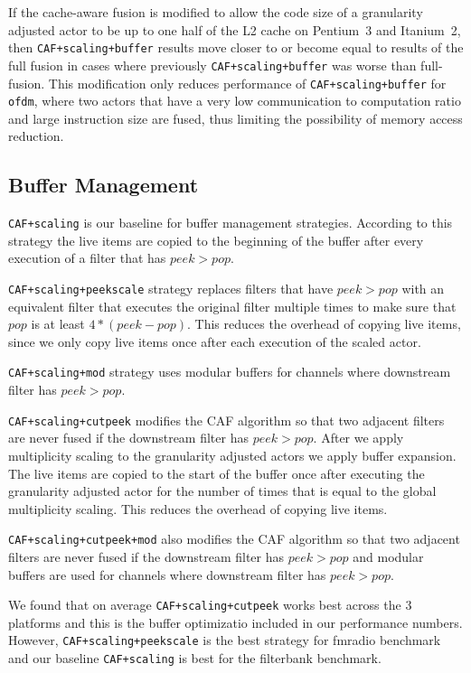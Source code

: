 If the cache-aware fusion is modified to allow the code size of a 
granularity adjusted actor to be up to one half of the L2 cache on 
Pentium~3 and Itanium~2, then \texttt{CAF+scaling+buffer} results
move closer to or become equal to results of the full fusion in cases where
previously \texttt{CAF+scaling+buffer} was worse than full-fusion.
This modification only reduces performance of \texttt{CAF+scaling+buffer}
for \texttt{ofdm}, where two actors that have a very low communication 
to computation ratio and large instruction size are fused, thus 
limiting the possibility of memory access reduction. 





\subsection{Buffer Management}

\texttt{CAF+scaling} is our baseline for buffer management strategies. 
According to this strategy the live items are copied to the beginning of 
the buffer after every execution of a filter that has 
$peek>pop$.

\texttt{CAF+scaling+peekscale} strategy replaces filters that have
$peek>pop$ with an equivalent filter that executes the original filter 
multiple times to make sure that $pop$ is at least $4*(peek-pop)$.
This reduces the overhead of copying live items, since we only copy live 
items once after each execution of the scaled actor.

\texttt{CAF+scaling+mod} strategy uses modular buffers for channels where 
downstream filter has $peek>pop$.

\texttt{CAF+scaling+cutpeek} modifies the CAF algorithm so that two 
adjacent filters are never fused if the downstream filter has 
$peek>pop$. After we apply multiplicity scaling to the 
granularity adjusted actors we apply buffer expansion. The 
live items are copied to the start of the buffer once after executing 
the granularity adjusted actor for the number of times that is equal 
to the global multiplicity scaling. This reduces the overhead of 
copying live items.

\texttt{CAF+scaling+cutpeek+mod} also modifies the CAF algorithm so 
that two adjacent filters are never fused if the downstream filter has 
$peek>pop$ and modular buffers are used for channels 
where downstream filter has $peek>pop$.

We found that on average \texttt{CAF+scaling+cutpeek} works best across 
the 3 platforms and this is the buffer optimizatio included in our 
performance numbers. However, \texttt{CAF+scaling+peekscale} is the 
best strategy for fmradio benchmark and our baseline \texttt{CAF+scaling} 
is best for the filterbank benchmark.



